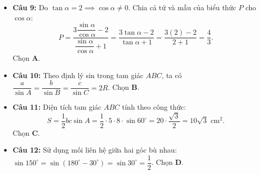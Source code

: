 \documentclass[12pt,a4paper]{article}
\begin{document}
\begin{itemize}[leftmargin=0.6cm, itemsep=3pt]
    \item \textbf{Câu 9:} Do $\tan \alpha = 2 \implies \cos \alpha \ne 0$. Chia cả tử và mẫu của biểu thức $P$ cho $\cos \alpha$:
    \[
    P = \dfrac{3\dfrac{\sin \alpha}{\cos \alpha} - 2}{\dfrac{\sin \alpha}{\cos \alpha} + 1} = \dfrac{3\tan \alpha - 2}{\tan \alpha + 1} = \dfrac{3(2) - 2}{2 + 1} = \dfrac{4}{3}.
    \]
    Chọn \textbf{A}.
    \item \textbf{Câu 10:} Theo định lý sin trong tam giác $ABC$, ta có $\dfrac{a}{\sin A} = \dfrac{b}{\sin B} = \dfrac{c}{\sin C} = 2R$. Chọn \textbf{B}.
    \item \textbf{Câu 11:} Diện tích tam giác $ABC$ tính theo công thức:
    \[
    S = \dfrac{1}{2}bc\sin A = \dfrac{1}{2} \cdot 5 \cdot 8 \cdot \sin 60^\circ = 20 \cdot \dfrac{\sqrt{3}}{2} = 10\sqrt{3}\text{ cm}^2.
    \]
    Chọn \textbf{C}.
    \item \textbf{Câu 12:} Sử dụng mối liên hệ giữa hai góc bù nhau: $\sin 150^\circ = \sin(180^\circ - 30^\circ) = \sin 30^\circ = \dfrac{1}{2}$. Chọn \textbf{D}.
\end{itemize}
\end{document}
